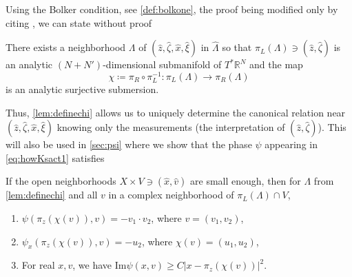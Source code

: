 \documentclass[
	fontsize=11pt, 
	twoside=false, 
	abstract=true, 
	a4paper,
]{scrartcl}
\newcommand{\RR}{\mathbb{R}}
\newcommand{\CC}{\mathbb{C}}
\newcommand{\abs}[1]{\left\lvert#1\right\rvert}
\newcommand{\wf}{\mathrm{WF}_{\mathrm{a}}}
\begin{document}
Using the Bolker condition, see \cref{def:bolkone}, the proof being modified only by citing \cite[Lem.~4.3]{zbMATH01860565}, we can state without proof  %
\begin{lemma}[{\cite[Lem.~5.5]{2306.05906v1}}]\label{lem:definechi}
	There exists a neighborhood $\Lambda$ of $(\hat z, \hat\zeta,\hat x,\hat \xi)$ in $\hat\Lambda$ so that $\pi_L(\Lambda) \ni (\hat z, \hat \zeta)$ is an analytic $(N+N')$-dimensional submanifold of $T^\ast\RR^N$ and the map
	\[
		\chi \coloneqq \pi_R \circ \pi_L^{-1} \colon \pi_L(\Lambda) \to \pi_R(\Lambda)
	\]
	is an analytic surjective submersion.
\end{lemma}

Thus, \cref{lem:definechi} allows us to uniquely determine the canonical relation near $(\hat z,\hat\zeta,\hat x,\hat\xi)$ knowing only the measurements (the interpretation of $(\hat z,\hat\zeta)$). This will also be used in \cref{sec:psi} where we show that the phase $\psi$ appearing in \cref{eq:howKsact1} satisfies
\begin{proposition}%
\label{prop:psi}
	If the open neighborhoods $X\times V \ni (\hat x, \hat v)$ are small enough, then for $\Lambda$ from \cref{lem:definechi} and all $v$ in a complex neighborhood of $\pi_L(\Lambda) \cap V$, 
	\begin{enumerate}
		\item $\psi(\pi_z(\chi(v)),v) = -v_1\cdot v_2$, where $v = (v_1,v_2)$,
		\item $\psi_x(\pi_z(\chi(v)),v) = -u_2$, where $\chi(v) = (u_1,u_2)$,
		\item For real $x,v$, we have $\mathrm{Im}\psi(x,v) \geq C\abs{x-\pi_z(\chi(v))}^2$.
	\end{enumerate}
\end{proposition}
\end{document}
